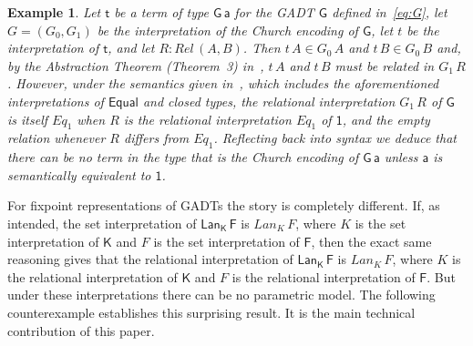 \documentclass[submission,copyright,creativecommons]{eptcs}
\newtheorem{example}[thm]{Example}
\begin{document}
\begin{example}\label{ex:CE-par}
Let $\mathsf{t}$ be a term of type $\mathsf{G\,a}$ for the GADT
$\mathsf{G}$ defined in~\eqref{eq:G}, let $G = (G_0,G_1)$ be the
interpretation of the Church encoding of $\mathsf{G}$, let $t$ be the
interpretation of $\mathsf{t}$, and let $R :
\mathit{Rel}\,(A,B)$. Then $t\, A \in G_0\,A$ and $t\,B \in G_0\,B$
and, by the Abstraction Theorem (Theorem~3) in~\cite{atk12}, $t\,A$
and $t\,B$ must be related in $G_1\,R$. However, under the semantics
given in~\cite{atk12}, which includes the aforementioned
interpretations of $\mathsf{Equal}$ and closed types, the relational
interpretation $G_1\,R$ of $\mathsf{G}$ is itself $\mathit{Eq}_1$ when
$R$ is the relational interpretation $\mathit{Eq}_1$ of $\mathsf{1}$,
and the empty relation whenever $R$ differs from
$\mathit{Eq}_1$. Reflecting back into syntax we deduce that there can
be no term in the type that is the Church encoding of $\mathsf{G\,a}$
unless $\mathsf{a}$ is semantically equivalent to $\mathsf{1}$.
\end{example}

For fixpoint representations of GADTs the story is completely
different. If, as intended, the set interpretation of
$\mathsf{Lan_K\,F}$ is $\mathit{Lan}_K\,F$, where $K$ is the set
interpretation of $\mathsf{K}$ and $F$ is the set interpretation of
$\mathsf{F}$, then the exact same reasoning gives that the relational
interpretation of $\mathsf{Lan_K\,F}$ is $\mathit{Lan}_K\,F$, where
$K$ is the relational interpretation of $\mathsf{K}$ and $F$ is the
relational interpretation of $\mathsf{F}$. But under these
interpretations there can be no parametric model. The following
counterexample establishes this surprising result. It is the main
technical contribution of this paper.
\end{document}
